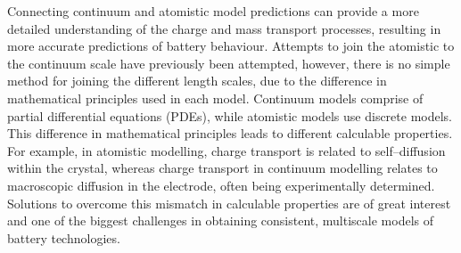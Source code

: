 \documentclass[journal=jacsat,manuscript=article]{achemso}
\begin{document}
Connecting continuum and atomistic model predictions can provide a more detailed understanding of the charge and mass transport processes, resulting in more accurate predictions of battery behaviour.
Attempts to join the atomistic to the continuum scale have previously been attempted, however, there is no simple method for joining the different length scales, due to the difference in mathematical principles used in each model.\cite{Fackeldey2015}
Continuum models comprise of partial differential equations (PDEs), while atomistic models use discrete models.\cite{Badia2007}
This difference in mathematical principles leads to different calculable properties.
For example, in atomistic modelling, charge transport is related to self--diffusion within the crystal, whereas charge transport in continuum modelling relates to macroscopic diffusion in the electrode, often being experimentally determined.
Solutions to overcome this mismatch in calculable properties are of great interest and one of the biggest challenges in obtaining consistent, multiscale models of battery technologies.


\end{document}
